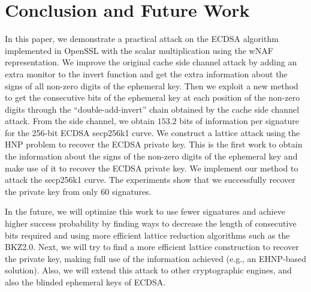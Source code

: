 \section{Conclusion and Future Work}
\label{sec:conclusion}
In this paper, we demonstrate a practical attack on the ECDSA algorithm implemented in OpenSSL with the scalar multiplication using the wNAF representation.
We improve the original cache side channel attack
 by adding an extra monitor to the invert function and get the extra information about the signs of all non-zero digits of the ephemeral key.
Then we exploit a new method to get the consecutive bits of the ephemeral key at each position of the non-zero digits through the ``double-add-invert'' chain obtained by the cache side channel attack.
From the side channel, we obtain $153.2$ bits of information per signature for the 256-bit ECDSA secp256k1 curve.
We construct a lattice attack using the HNP problem to recover the ECDSA private key.
This is the first work to obtain the information about the signs of the non-zero digits of the ephemeral key and make use of it to recover the ECDSA private key.
We implement our method to attack the secp256k1 curve.
The experiments show that we successfully recover the private key from only $60$ signatures.

In the future, 
we will optimize this work to use fewer signatures and achieve higher success probability by finding ways to decrease the length of consecutive bits required and using more efficient lattice reduction algorithms such as the BKZ2.0.
Next, we will try to find a more efficient lattice construction to recover the private key,
    making full use of the information achieved (e.g., an EHNP-based solution).
Also, we will extend this attack to other cryptographic engines,
    and also the blinded ephemeral keys of ECDSA.


